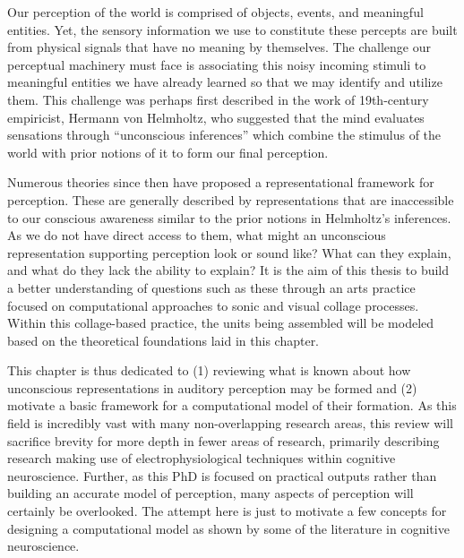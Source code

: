 \documentclass[a4paper,10pt,final]{ThesisStyle}
\begin{document}
Our perception of the world is comprised of objects, events, and meaningful entities.  Yet, the sensory information we use to constitute these percepts are built from physical signals that have no meaning by themselves.  The challenge our perceptual machinery must face is associating this noisy incoming stimuli to meaningful entities we have already learned so that we may identify and utilize them.  This challenge was perhaps first described in the work of 19th-century empiricist, Hermann von Helmholtz, who suggested that the mind evaluates sensations through ``unconscious inferences'' which combine the stimulus of the world with prior notions of it to form our final perception. 

Numerous theories since then have proposed a representational framework for perception.  These are generally described by representations that are inaccessible to our conscious awareness similar to the prior notions in Helmholtz's inferences.  As we do not have direct access to them, what might an unconscious representation supporting perception look or sound like?  What can they explain, and what do they lack the ability to explain?  It is the aim of this thesis to build a better understanding of questions such as these through an arts practice focused on computational approaches to sonic and visual collage processes.  Within this collage-based practice, the units being assembled will be modeled based on the theoretical foundations laid in this chapter.  

This chapter is thus dedicated to (1) reviewing what is known about how unconscious representations in auditory perception may be formed and (2) motivate a basic framework for a computational model of their formation.  As this field is incredibly vast with many non-overlapping research areas, this review will sacrifice brevity for more depth in fewer areas of research, primarily describing research making use of electrophysiological techniques within cognitive neuroscience.  Further, as this PhD is focused on practical outputs rather than building an accurate model of perception, many aspects of perception will certainly be overlooked.  The attempt here is just to motivate a few concepts for designing a computational model as shown by some of the literature in cognitive neuroscience.   

\end{document}
